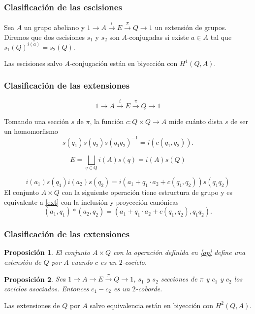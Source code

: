 \documentclass[
	11pt, %
]{beamer}
\newcommand{\homo}[3]{#1\colon #2\to #3}
\newcommand{\extension}[5]{1\xrightarrow{} #3 \xrightarrow{#1} #4\xrightarrow{#2} #5 \xrightarrow{} 1}
\newtheorem{proposition}{Proposici\'on}
\begin{document}
\begin{frame}
	\frametitle{Clasificación de las escisiones}
	\begin{definition}
		Sea $A$ un grupo abeliano y $\extension i \pi A E Q$ un extensión de grupos. Diremos que dos escisiones $s_1$ y $s_2$ son $A$-conjugadas si existe $a\in A$ tal que $s_1(Q)^{i(a)} = s_2(Q)$.
	\end{definition}
	
	\begin{theorem}
		Las escisiones salvo $A$-conjugación están en biyección con $H^1(Q,A)$.
	\end{theorem}
\end{frame}

\begin{frame}
	\frametitle{Clasificación de las extensiones}
	
	\begin{equation}\label{ext}
		\extension i \pi A E Q
	\end{equation}
	
	Tomando una sección $s$ de $\pi$, la función $\homo c {Q\times Q} A$ mide cuánto dista $s$ de ser un homomorfismo
	\begin{equation*}
		s(q_1)s(q_2)s(q_1q_2)^{-1} = i(c(q_1,q_2)).
	\end{equation*}
	
	$$	
		E = \bigsqcup_{q\in Q} i(A)s(q) = i(A)s(Q)
	$$
	
	$$
		i(a_1)s(q_1)i(a_2)s(q_2) = %
		i(a_1+q_1\cdot a_2 + c(q_1,q_2))s(q_1q_2)
	$$
	El conjunto $A\times Q$ con la siguiente operación tiene estructura de grupo y es equivalente a \eqref{ext} con la inclusión y proyección canónicas
	\begin{equation}\label{op}
		(a_1,q_1)*(a_2,q_2) = (a_1+q_1\cdot a_2 + c(q_1,q_2),q_1q_2). 
	\end{equation}
\end{frame}

\begin{frame}
	\frametitle{Clasificación de las extensiones}
	\begin{proposition}
		El conjunto $A\times Q$ con la operación definida en \eqref{op} define una extensión de $Q$ por $A$ cuando $c$ es un $2$-cociclo.
	\end{proposition}
	
	\begin{proposition}
		Sea $\extension {}{\pi} A E Q$, $s_1$ y $s_2$ secciones de $\pi$ y $c_1$ y $c_2$ los cociclos asociados. Entonces $c_1-c_2$ es un $2$-coborde. 
	\end{proposition}
	
	\begin{theorem}
		Las extensiones de $Q$ por $A$ salvo equivalencia están en biyección con $H^2(Q,A)$.
	\end{theorem}	
\end{frame}
\end{document}
